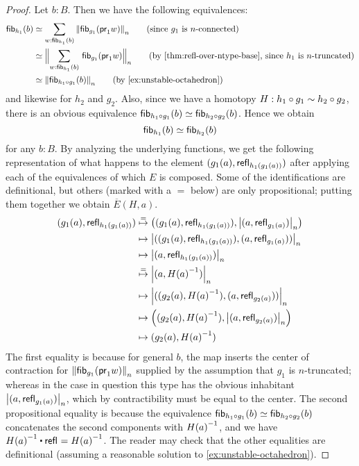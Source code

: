 \begin{proof}
Let $b:B$. Then we have the following equivalences:
\begin{align}
\hfib{h_1}b
& \eqvsym \sm{w:\hfib{h_1}b} \trunc n{ \hfib{g_1}{\proj1 w}}
\tag{since $g_1$ is $n$-connected}\\
& \eqvsym \Trunc n{\sm{w:\hfib{h_1}b}\hfib{g_1}{\proj1 w}}
\tag{by \cref{thm:refl-over-ntype-base}, since $h_1$ is $n$-truncated}\\
& \eqvsym \trunc n{\hfib{h_1\circ g_1}b}
\tag{by \cref{ex:unstable-octahedron}}
\end{align}
and likewise for $h_2$ and $g_2$.
Also, since we have a homotopy $H:h_1\circ g_1\htpy h_2\circ g_2$, there is an obvious equivalence $\hfib{h_1\circ g_1}b\eqvsym\hfib{h_2\circ g_2}b$.
Hence we obtain
\begin{equation*}
\hfib{h_1}b\eqvsym\hfib{h_2}b
\end{equation*}
for any $b:B$. By analyzing the underlying functions, we get the following representation of what happens to the element
$\pairr{g_1(a),\refl{h_1(g_1(a))}}$ after applying each of the equivalences of which $E$ is composed.
Some of the identifications are definitional, but others (marked with a $=$ below) are only propositional; putting them together we obtain $\overline E(H,a)$.
{\allowdisplaybreaks
\begin{align*}
\pairr{g_1(a),\refl{h_1(g_1(a))}} &
    \overset{=}{\mapsto} \Pairr{\pairr{g_1(a),\refl{h_1(g_1(a))}}, \tproj n{ \pairr{a,\refl{g_1(a)}}}}\\
  & \mapsto \tproj n { \pairr{\pairr{g_1(a),\refl{h_1(g_1(a))}}, \pairr{a,\refl{g_1(a)}} }}\\
  & \mapsto \tproj n { \pairr{a,\refl{h_1(g_1(a))}}}\\
  & \overset{=}{\mapsto} \tproj n { \pairr{a,\opp{H(a)}}}\\
  & \mapsto \tproj n { \pairr{\pairr{g_2(a),\opp{H(a)}},\pairr{a,\refl{g_2(a)}}} }\\
  & \mapsto \Pairr{\pairr{g_2(a),\opp{H(a)}}, \tproj n {\pairr{a,\refl{g_2(a)}}} }\\
  & \mapsto \pairr{g_2(a),\opp{H(a)}}
\end{align*}}
The first equality is because for general $b$, the map
inserts the center of contraction for $\trunc n{ \hfib{g_1}{\proj1 w}}$ supplied by the assumption that $g_1$ is $n$-truncated; whereas in the case in question this type has the obvious inhabitant $\tproj n{ \pairr{a,\refl{g_1(a)}}}$, which by contractibility must be equal to the center.
The second propositional equality is because the equivalence $\hfib{h_1\circ g_1}b\eqvsym\hfib{h_2\circ g_2}b$ concatenates the second components with $\opp{H(a)}$, and we have $\opp{H(a)} \ct \refl{} = \opp{H(a)}$.
The reader may check that the other equalities are definitional (assuming a reasonable solution to \cref{ex:unstable-octahedron}).
\end{proof}

